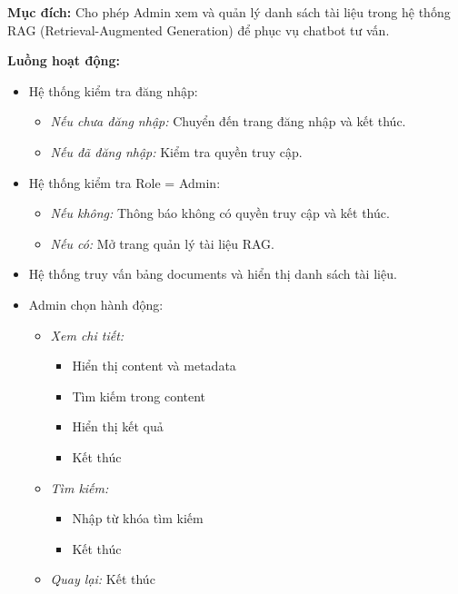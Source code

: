 \textbf{Mục đích:} Cho phép Admin xem và quản lý danh sách tài liệu trong hệ thống RAG (Retrieval-Augmented Generation) để phục vụ chatbot tư vấn.

\textbf{Luồng hoạt động:}

\begin{itemize}
    \item Hệ thống kiểm tra đăng nhập:
    \begin{itemize}
        \item \textit{Nếu chưa đăng nhập:} Chuyển đến trang đăng nhập và kết thúc.
        \item \textit{Nếu đã đăng nhập:} Kiểm tra quyền truy cập.
    \end{itemize}
    
    \item Hệ thống kiểm tra Role = Admin:
    \begin{itemize}
        \item \textit{Nếu không:} Thông báo không có quyền truy cập và kết thúc.
        \item \textit{Nếu có:} Mở trang quản lý tài liệu RAG.
    \end{itemize}
    
    \item Hệ thống truy vấn bảng documents và hiển thị danh sách tài liệu.
    
    \item Admin chọn hành động:
    \begin{itemize}
        \item \textit{Xem chi tiết:}
        \begin{itemize}
            \item Hiển thị content và metadata
            \item Tìm kiếm trong content
            \item Hiển thị kết quả
            \item Kết thúc
        \end{itemize}
        \item \textit{Tìm kiếm:}
        \begin{itemize}
            \item Nhập từ khóa tìm kiếm
            \item Kết thúc
        \end{itemize}
        \item \textit{Quay lại:} Kết thúc
    \end{itemize}
\end{itemize}

